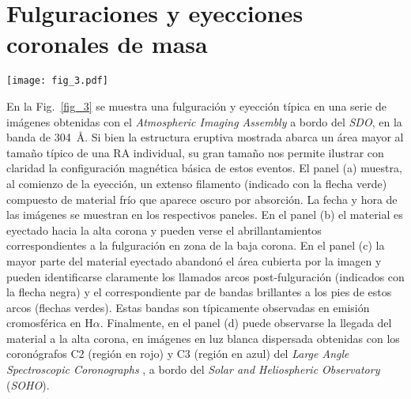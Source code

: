 \documentclass[baaa]{baaa}
\begin{document}
\section{Fulguraciones y eyecciones coronales de masa}
\label{S_activity}

\begin{figure*}[!t]
\centering
\texttt{[image: fig\_3.pdf]}
\caption{Secuencia de imágenes en el EUV del {\sl SDO/AIA} en la banda de 304~\AA, correspondientes a la ECM observada el 31 de agosto de 2012 a partir de las 19:00 UT. La hora de observación de las imágenes se muestra en cada panel. (a) Al comienzo de la eyección se observa, indicado con la flecha verde, material filamentario en absorción, sostenido por la estructura magnética. (b) Al producirse la eyección la cuerda de flujo magnético que contiene el material es eyectada hacia la alta corona. (c) Por debajo de la estructura eyectada pueden identificarse los arcos post-fulguración (indicados con la flecha negra) y bandas brillantes en emisión en los pies de los arcos (indicadas con flechas verdes). (d) Imagen compuesta con datos del {\sl SDO/AIA} en el centro de la imagen y de los coronógrafos C2 (en rojo) y C3 (en azul) a bordo del {\sl Solar and Heliospheric Observatory (SOHO)}, mostrando la evolución posterior de la ECM.}
\label{fig_3}
\end{figure*}

En la Fig.~\ref{fig_3} se muestra una fulguración y eyección típica en una serie de imágenes obtenidas con el {\sl Atmospheric Imaging Assembly} \citep[{\sl AIA}][]{lemen2012} a bordo del {\sl SDO}, en la banda de 304~\AA. Si bien la estructura eruptiva mostrada abarca un área mayor al tamaño típico de una RA individual, su gran tamaño nos permite ilustrar con claridad la configuración magnética básica de estos eventos. El panel (a) muestra, al comienzo de la eyección, un extenso filamento (indicado con la flecha verde) compuesto de material frío que aparece oscuro por absorción. La fecha y hora de las imágenes se muestran en los respectivos paneles. En el panel (b) el material es eyectado hacia la alta corona y pueden verse el abrillantamientos correspondientes a la fulguración en zona de la baja corona. En el panel (c) la mayor parte del material eyectado abandonó el área cubierta por la imagen y pueden identificarse claramente los llamados arcos post-fulguración (indicados con la flecha negra) y el correspondiente par de bandas brillantes a los pies de estos arcos (flechas verdes). Estas bandas son típicamente observadas en emisión cromosférica en H$\alpha$. Finalmente, en el panel (d) puede observarse la llegada del material a la alta corona, en imágenes en luz blanca dispersada obtenidas con los coronógrafos C2 (región en rojo) y C3 (región en azul) del {\sl Large Angle Spectroscopic Coronographs} \citep[{\sl LASCO},][]{brueckner1995}, a bordo del {\sl Solar and Heliospheric Observatory} ({\sl SOHO}).
\end{document}
